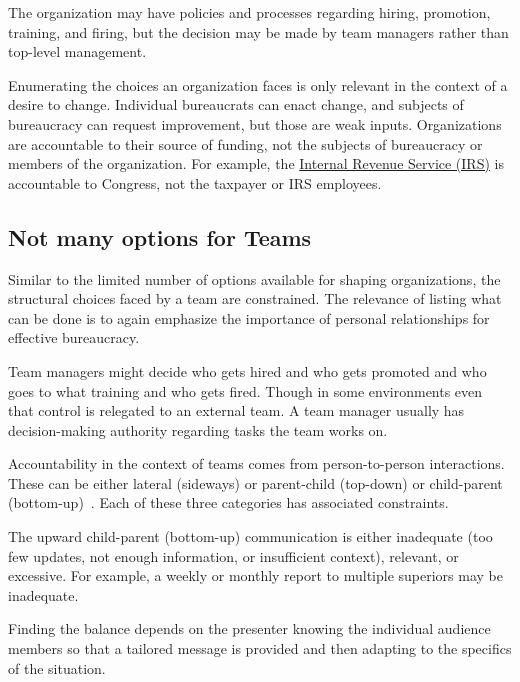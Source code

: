 The organization may have policies and processes regarding hiring, promotion, training, and firing, but the decision may be made by team managers rather than top-level management. 

Enumerating the choices an organization faces is only relevant in the context of a desire to change. 
Individual bureaucrats can enact change, and subjects of bureaucracy can request improvement, but those are weak inputs. 
Organizations are accountable to their source of funding, not the subjects of bureaucracy or members of the organization. For example, the \href{https://en.wikipedia.org/wiki/Internal_Revenue_Service}{Internal Revenue Service (IRS)} 
is accountable to Congress, not the taxpayer or IRS employees. 

\subsection*{Not many options for Teams}

Similar to the limited number of options available for shaping organizations, the structural choices faced by a team are constrained. The relevance of listing what can be done is to again emphasize the importance of personal relationships for effective bureaucracy. 

Team managers might decide who gets hired and who gets promoted and who goes to what training and who gets fired. Though in some environments even that control is relegated to an external team. A team manager usually has decision-making authority regarding tasks the team works on. 

Accountability in the context of teams comes from person-to-person interactions. These can be either lateral (sideways) or parent-child (top-down) or child-parent (bottom-up)~\cite{2014_Jorgensen}. Each of these three categories has associated constraints.

The upward child-parent (bottom-up) communication is either inadequate (too few updates, not enough information, or insufficient context), relevant, or excessive. For example, a weekly or monthly report to multiple superiors may be inadequate. 

Finding the balance depends on the presenter knowing the individual audience members so that a tailored message is provided and then adapting to the specifics of the situation. 

